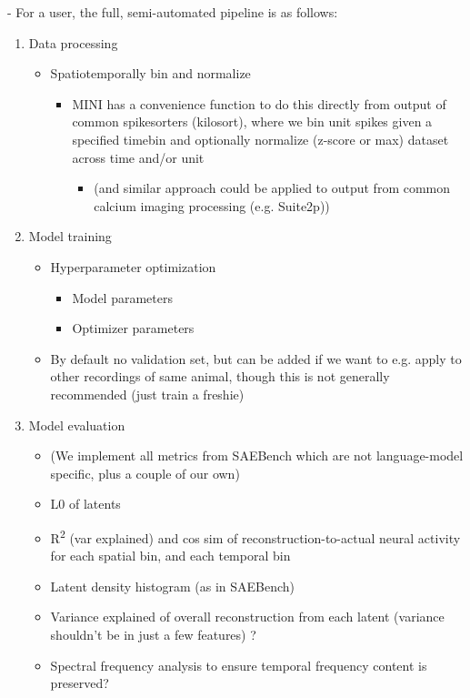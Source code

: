 - For a user, the full, semi-automated pipeline is as follows:
\begin{enumerate}
    \item Data processing
    \begin{itemize}
        \item Spatiotemporally bin and normalize
        \begin{itemize}
            \item MINI has a convenience function to do this directly from output of common spikesorters (kilosort), where we bin unit spikes given a specified timebin and optionally normalize (z-score or max) dataset across time and/or unit
            \begin{itemize}
                \item (and similar approach could be applied to output from common calcium imaging processing (e.g. Suite2p))
            \end{itemize}
        \end{itemize}
    \end{itemize}
    
    \item Model training
    \begin{itemize}
        \item Hyperparameter optimization
        \begin{itemize}
            \item Model parameters
            \item Optimizer parameters
        \end{itemize}
        \item By default no validation set, but can be added if we want to e.g. apply to other recordings of same animal, though this is not generally recommended (just train a freshie)
    \end{itemize}
    
    \item Model evaluation
    \begin{itemize}
        \item (We implement all metrics from SAEBench which are not language-model specific, plus a couple of our own)
        \item L0 of latents
        \item R\textsuperscript{2} (var explained) and cos sim of reconstruction-to-actual neural activity for each spatial bin, and each temporal bin
        \item Latent density histogram (as in SAEBench)
        \item Variance explained of overall reconstruction from each latent (variance shouldn't be in just a few features) ?
        \item Spectral frequency analysis to ensure temporal frequency content is preserved?
    \end{itemize}
    

\end{enumerate}
